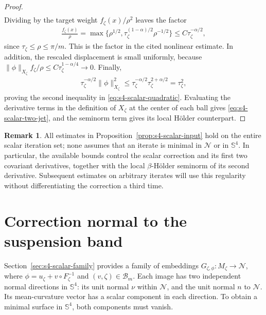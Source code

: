 \documentclass[a4paper,11pt,oneside,reqno]{amsart}
\numberwithin{equation}{section}
\theoremstyle{definition}
\newtheorem{remark}[theorem]{Remark}
\begin{document}
\begin{proof}
\begin{align*}
    \end{align*}
    Dividing by the target weight $f_\zeta(x)/\rho^2$
    leaves the factor
    \begin{align*}
        \frac{f_\zeta(x)}\rho
        =\max\{\rho^{1/2},
                   \tau_\zeta^{(1-\alpha)/2}\rho^{-1/2}\}
        \leq C\tau_\zeta^{-\alpha/2},
    \end{align*}
    since $\tau_\zeta\leq\rho\leq\pi/m$.
    This is the factor in the cited nonlinear estimate.
    In addition, the rescaled displacement is small uniformly,
    because
    $\|\phi\|_{X_\zeta}f_\zeta/\rho
       \leq C\tau_\zeta^{1-\alpha/4}\to0$.
    Finally,
    \begin{align*}
        \tau_\zeta^{-\alpha/2}\|\phi\|_{X_\zeta}^2
        \leq\tau_\zeta^{-\alpha/2}
                    \tau_\zeta^{2+\alpha/2}
        =\tau_\zeta^2,
    \end{align*}
    proving the second inequality in
    \eqref{eq:s4-scalar-quadratic}.
    Evaluating the derivative terms in the definition of
    $X_\zeta$ at the center of each ball gives
    \eqref{eq:s4-scalar-two-jet}, and the seminorm term gives
    its local H\"older counterpart.
\end{proof}

\begin{remark}
    \label{rem:s4-scalar-scope}
    All estimates in Proposition~\ref{prop:s4-scalar-input} hold
    on the entire scalar iteration set; none assumes that an
    iterate is minimal in $\mathcal{N}$ or in $\mathbb{S}^4$. In particular,
    the available bounds control the scalar correction and
    its first two covariant derivatives, together with the
    local $\beta$-H\"older seminorm of its second derivative.
    Subsequent estimates on arbitrary iterates will use this
    regularity without differentiating the correction a third
    time.
\end{remark}

\section{Correction normal to the suspension band}
\label{sec:s4-transverse}

Section~\ref{sec:s4-scalar-family} provides a family of embeddings
$G_{\zeta,\phi}:M_\zeta\to\mathcal N$, where
$\phi=u_\zeta+v\circ F_\zeta^{-1}$ and
$(v,\zeta)\in\mathcal B_m$. Each image has two independent
normal directions in $\mathbb S^4$: its unit normal $\nu$ within
$\mathcal N$, and the unit normal $n$ to $\mathcal N$.
Its mean-curvature vector has a scalar component in each
direction. To obtain a minimal surface in $\mathbb S^4$, both
components must vanish.
\end{document}
